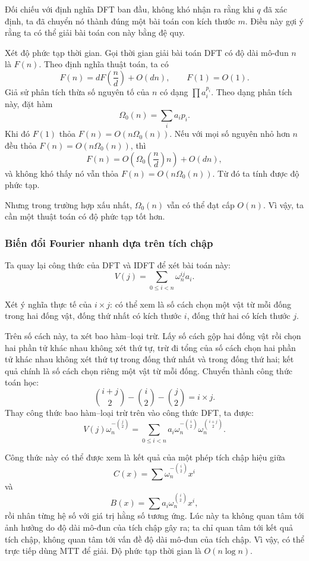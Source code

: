 \documentclass[11pt]{article}
\begin{document}
Đối chiếu với định nghĩa DFT ban đầu, không khó nhận ra rằng khi \(q\) đã xác
định, ta đã chuyển nó thành đúng một bài toán con kích thước \(m\). Điều này
gợi ý rằng ta có thể giải bài toán con này bằng đệ quy.

Xét độ phức tạp thời gian. Gọi thời gian giải bài toán DFT có độ dài mô-đun
\(n\) là \(F(n)\). Theo định nghĩa thuật toán, ta có
\[
F(n)=dF\left(\frac nd\right)+O(dn),\qquad F(1)=O(1).
\]
Giả sử phân tích thừa số nguyên tố của \(n\) có dạng \(\prod a_i^{p_i}\). Theo
dạng phân tích này, đặt hàm
\[
\Omega_0(n)=\sum_i a_i p_i.
\]
Khi đó \(F(1)\) thỏa \(F(n)=O(n\Omega_0(n))\). Nếu với mọi số nguyên nhỏ hơn
\(n\) đều thỏa \(F(n)=O(n\Omega_0(n))\), thì
\[
F(n)=O\left(\Omega_0\left(\frac nd\right)n\right)+O(dn),
\]
và không khó thấy nó vẫn thỏa \(F(n)=O(n\Omega_0(n))\). Từ đó ta tính được độ
phức tạp.

Nhưng trong trường hợp xấu nhất, \(\Omega_0(n)\) vẫn có thể đạt cấp \(O(n)\).
Vì vậy, ta cần một thuật toán có độ phức tạp tốt hơn.

\subsubsection{Biến đổi Fourier nhanh dựa trên tích chập}

Ta quay lại công thức của DFT và IDFT để xét bài toán này:
\[
V(j)=\sum_{0\le i<n}\omega_n^{ij}a_i.
\]

Xét ý nghĩa thực tế của \(i\times j\): có thể xem là số cách chọn một vật từ
mỗi đống trong hai đống vật, đống thứ nhất có kích thước \(i\), đống thứ hai có
kích thước \(j\).

Trên số cách này, ta xét bao hàm--loại trừ. Lấy số cách gộp hai đống vật rồi
chọn hai phần tử khác nhau không xét thứ tự, trừ đi tổng của số cách chọn hai
phần tử khác nhau không xét thứ tự trong đống thứ nhất và trong đống thứ hai;
kết quả chính là số cách chọn riêng một vật từ mỗi đống. Chuyển thành công thức
toán học:
\[
\binom{i+j}{2}-\binom{i}{2}-\binom{j}{2}=i\times j.
\]
Thay công thức bao hàm--loại trừ trên vào công thức DFT, ta được:
\[
V(j)\omega_n^{-\binom j2}
=\sum_{0\le i<n}a_i\omega_n^{-\binom i2}\omega_n^{\binom{i+j}{2}}.
\]

Công thức này có thể được xem là kết quả của một phép tích chập hiệu giữa
\[
C(x)=\sum\omega_n^{-\binom i2}x^i
\]
và
\[
B(x)=\sum a_i\omega_n^{\binom i2}x^i,
\]
rồi nhân từng hệ số với giá trị hằng số tương ứng. Lúc này ta không quan tâm
tới ảnh hưởng do độ dài mô-đun của tích chập gây ra; ta chỉ quan tâm tới kết
quả tích chập, không quan tâm tới vấn đề độ dài mô-đun của tích chập. Vì vậy,
có thể trực tiếp dùng MTT để giải. Độ phức tạp thời gian là \(O(n\log n)\).
\end{document}
